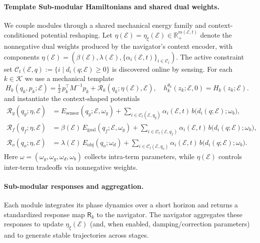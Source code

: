 \documentclass{article} %
\begin{document}
\paragraph{Template {Sub-modular} Hamiltonians and shared dual weights.}
We couple modules through a shared mechanical energy family and context-conditioned potential { reshaping}.
Let $\eta(\mathcal E)=\eta_{\xi}(\mathcal E)\in\mathbb R_+^{m(\mathcal E,t)}$ denote the nonnegative dual weights produced by
the navigator's context encoder, with components
$\eta(\mathcal E)=(\beta(\mathcal E),\lambda(\mathcal E),\{\alpha_i(\mathcal E,t)\}_{i\in\mathcal C_t})$.
The active constraint set $\mathcal C_t(\mathcal E,q):=\{i\mid d_i(q;\mathcal E)\ge 0\}$ is discovered online by sensing.
For each $k\in\mathcal K$ we use a mechanical template
\begin{equation}
\label{eq:module_template_hamiltonian}
 H_k(q_k,p_k;\mathcal E)
 =\tfrac12\,p_k^\top M^{-1}p_k+\mathcal R_k(q_k;\eta(\mathcal E),\mathcal E), \quad h_k^{\theta_k}(z_k;\mathcal{E},0)=H_k(z_k;\mathcal{E}).
\end{equation}
and instantiate the context-shaped potentials
\begin{align}
\label{eq:module_potentials}
 \mathcal R_y(q_y;\eta,\mathcal E)
 &=E_{\mathrm{sensor}}(q_y;\mathcal E,\omega_y)
 +\sum_{i\in\mathcal C_t(\mathcal E,q_y)}\alpha_i(\mathcal E,t)\,b\!\big(d_i(q;\mathcal E);\omega_b\big),\\
 \mathcal R_f(q_f;\eta,\mathcal E)
 &=\beta(\mathcal E)\,E_{\mathrm{goal}}(q_f;\mathcal E,\omega_g)
 +\sum_{i\in\mathcal C_t(\mathcal E,q_f)}\alpha_i(\mathcal E,t)\,b\!\big(d_i(q;\mathcal E);\omega_b\big),\\
 \mathcal R_o(q_o;\eta,\mathcal E)
 &=\lambda(\mathcal E)\,E_{\mathrm{obj}}(q_o;\omega_d)
 +\sum_{i\in\mathcal C_t(\mathcal E,q_o)}\alpha_i(\mathcal E,t)\,b\!\big(d_i(q;\mathcal E);\omega_b\big).
 \label{eq:module_template_potential:o}
\end{align}
Here $\omega=(\omega_y,\omega_g,\omega_d,\omega_b)$ collects intra-term parameters, while $\eta(\mathcal E)$ controls
inter-term tradeoffs via nonnegative weights.

\paragraph{{Sub-modular} responses and aggregation.}
Each module integrates its phase dynamics over a short horizon and returns a standardized response map $\mathsf R_k$  to the navigator. The navigator aggregates these responses to update $\eta_{\xi}(\mathcal E)$ (and, when enabled,
damping/correction parameters) and to generate stable trajectories across stages.
\end{document}
